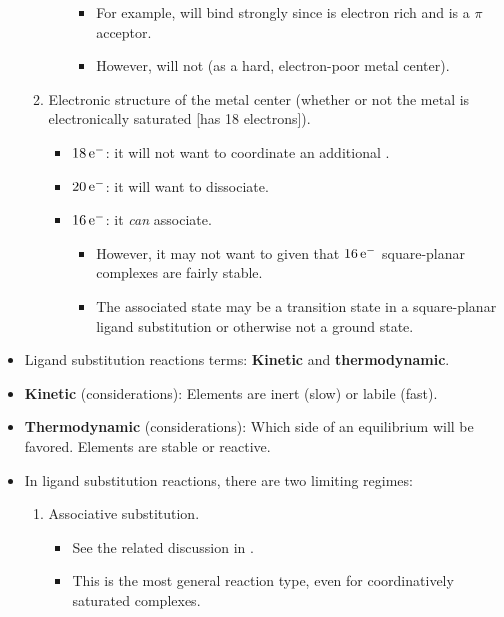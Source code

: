 \documentclass[../notes.tex]{subfiles}
\begin{document}
\begin{itemize}
\begin{enumerate}
\begin{itemize}
            \begin{itemize}
                \item For example,  will bind  strongly since  is electron rich and  is a $\pi$ acceptor.
                \item However,  will not (as a hard, electron-poor metal center).
            \end{itemize}
        \end{itemize}
        \item Electronic structure of the metal center (whether or not the metal is electronically saturated [has 18 electrons]).
        \begin{itemize}
            \item $18\,\e[-]$: it will not want to coordinate an additional .
            \item $20\,\e[-]$: it will want to dissociate.
            \item $16\,\e[-]$: it \emph{can} associate.
            \begin{itemize}
                \item However, it may not want to given that $16\,\e[-]$ square-planar complexes are fairly stable.
                \item The associated state may be a transition state in a square-planar ligand substitution or otherwise not a ground state.
            \end{itemize}
        \end{itemize}
    \end{enumerate}
    \item Ligand substitution reactions terms: \textbf{Kinetic} and \textbf{thermodynamic}.
    \item \textbf{Kinetic} (considerations): Elements are inert (slow) or labile (fast).
    \item \textbf{Thermodynamic} (considerations): Which side of an equilibrium will be favored. Elements are stable or reactive.
    \item In ligand substitution reactions, there are two limiting regimes:
    \begin{enumerate}
        \item Associative substitution.
        \begin{itemize}
            \item See the related discussion in \textcite{bib:CHEM20100Notes}.
            \item This is the most general reaction type, even for coordinatively saturated complexes.

\end{itemize}
\end{enumerate}
\end{itemize}
\end{document}
